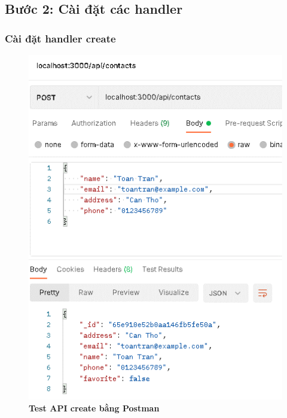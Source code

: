 \subsection*{Bước 2: Cài đặt các handler}
\setcounter{subsection}{3}
\setcounter{figure}{0}

\subsubsection*{Cài đặt handler create}
\begin{figure}[H]
  \centering
  \includegraphics{images/chapterSecond/4.png}
  \caption{\bfseries Test API create bằng Postman}
\end{figure}
